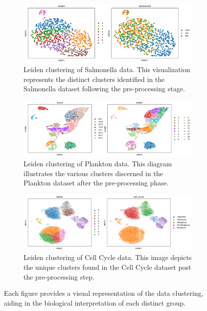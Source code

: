 \documentclass[12pt,a4paper]{article}
\begin{document}
\begin{figure}
  \centering
  \begin{subfigure}{\linewidth}
    \includegraphics[width=\linewidth]{Figures/salmonella_clusters_before_DML.png}
    \caption{Leiden clustering of Salmonella data. This visualization represents the distinct clusters identified in the Salmonella dataset following the pre-processing stage.}
    \label{multifig1:image_a}
  \end{subfigure}
  \hfill
  \begin{subfigure}{\linewidth}
    \includegraphics[width =\linewidth]{Figures/plankton_clusters_before_DML.png}
    \caption{Leiden clustering of Plankton data. This diagram illustrates the various clusters discerned in the Plankton dataset after the pre-processing phase.}
    \label{multifig1:image_b}
  \end{subfigure}
  \hfill
  \begin{subfigure}{\linewidth}
    \includegraphics[width=\linewidth]{Figures/cellcycle_clusters_before_DML.png}
    \caption{Leiden clustering of Cell Cycle data. This image depicts the unique clusters found in the Cell Cycle dataset post the pre-processing step.}
    \label{multifig1:image_c}
  \end{subfigure}
  \caption{Each figure provides a visual representation of the data clustering, aiding in the biological interpretation of each distinct group.}
  \label{multifig1:overall_figure}
\end{figure}
\end{document}
